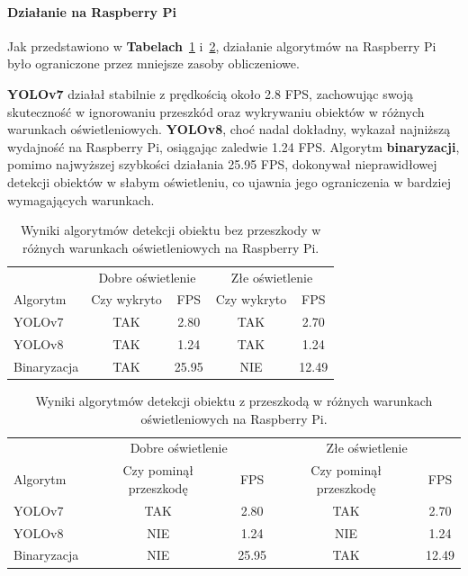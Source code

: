 \documentclass[a4paper,twoside,12pt]{book}
\begin{document}
\newpage

\paragraph{Działanie na Raspberry Pi}
Jak przedstawiono w \textbf{Tabelach}~\ref{tab:bez_przeszkody_rpi} i~\ref{tab:z_przeszkoda_rpi}, działanie algorytmów na Raspberry Pi było ograniczone przez mniejsze zasoby obliczeniowe. 

\textbf{YOLOv7} działał stabilnie z prędkością około 2.8 FPS, zachowując swoją skuteczność w ignorowaniu przeszkód oraz wykrywaniu obiektów w różnych warunkach oświetleniowych. \textbf{YOLOv8}, choć nadal dokładny, wykazał najniższą wydajność na Raspberry Pi, osiągając zaledwie 1.24 FPS. Algorytm \textbf{binaryzacji}, pomimo najwyższej szybkości działania 25.95 FPS, dokonywał nieprawidłowej detekcji obiektów w słabym oświetleniu, co ujawnia jego ograniczenia w bardziej wymagających warunkach.

\begin{table}[h!]
    \centering
    \caption{Wyniki algorytmów detekcji obiektu bez przeszkody w różnych warunkach oświetleniowych na Raspberry Pi.}
    \label{tab:bez_przeszkody_rpi}
    \begin{tabular}{lcccc}
    \toprule
     & \multicolumn{2}{c}{Dobre oświetlenie} & \multicolumn{2}{c}{Złe oświetlenie} \\
    \cmidrule(r){2-3} \cmidrule(r){4-5}
    Algorytm & Czy wykryto & FPS & Czy wykryto & FPS \\
    \midrule
    YOLOv7 & TAK & 2.80 & TAK & 2.70 \\
    YOLOv8 & TAK & 1.24 & TAK & 1.24 \\
    Binaryzacja & TAK & 25.95 & NIE & 12.49 \\
    \bottomrule
    \end{tabular}
\end{table}

\begin{table}[h!]
    \centering
    \caption{Wyniki algorytmów detekcji obiektu z przeszkodą w różnych warunkach oświetleniowych na Raspberry Pi.}
    \label{tab:z_przeszkoda_rpi}
    \begin{tabular}{lcccc}
    \toprule
     & \multicolumn{2}{c}{Dobre oświetlenie} & \multicolumn{2}{c}{Złe oświetlenie} \\
    \cmidrule(r){2-3} \cmidrule(r){4-5}
    Algorytm & Czy pominął przeszkodę & FPS & Czy pominął przeszkodę & FPS \\
    \midrule
    YOLOv7 & TAK & 2.80 & TAK & 2.70 \\
    YOLOv8 & NIE & 1.24 & NIE & 1.24 \\
    Binaryzacja & NIE & 25.95 & TAK & 12.49 \\
    \bottomrule
    \end{tabular}
\end{table}
\end{document}
